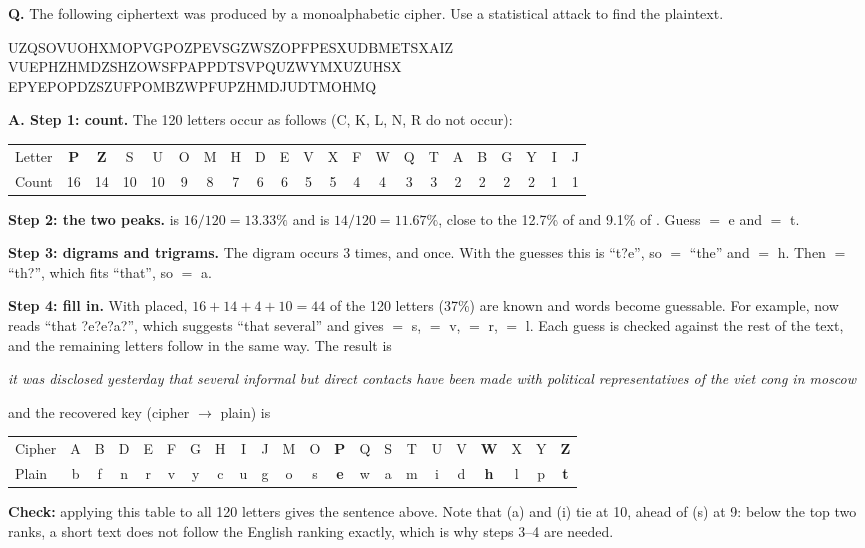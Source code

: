 \begin{worked}
\textbf{Q.} The following ciphertext was produced by a monoalphabetic cipher. Use a statistical attack to find the plaintext.
\begin{center}\small\ttfamily
UZQSOVUOHXMOPVGPOZPEVSGZWSZOPFPESXUDBMETSXAIZ\\
VUEPHZHMDZSHZOWSFPAPPDTSVPQUZWYMXUZUHSX\\
EPYEPOPDZSZUFPOMBZWPFUPZHMDJUDTMOHMQ
\end{center}
\textbf{A. Step 1: count.} The 120 letters occur as follows (C, K, L, N, R do not occur):
\begin{center}\small\setlength{\tabcolsep}{3pt}
\begin{tabular}{@{}l*{21}{c}@{}}
\toprule
Letter & \textbf{P}&\textbf{Z}&S&U&O&M&H&D&E&V&X&F&W&Q&T&A&B&G&Y&I&J\\
Count & 16&14&10&10&9&8&7&6&6&5&5&4&4&3&3&2&2&2&2&1&1\\
\bottomrule
\end{tabular}
\end{center}
\textbf{Step 2: the two peaks.}  is $16/120 = 13.33\%$ and  is $14/120 = 11.67\%$, close to the 12.7\% of  and 9.1\% of . Guess  $=$ e and  $=$ t.

\textbf{Step 3: digrams and trigrams.} The digram  occurs 3 times, and  once. With the guesses this is ``t?e'', so  $=$ ``the'' and  $=$ h. Then  $=$ ``th?'', which fits ``that'', so  $=$ a.

\textbf{Step 4: fill in.} With  placed, $16 + 14 + 4 + 10 = 44$ of the 120 letters (37\%) are known and words become guessable. For example,  now reads ``that ?e?e?a?'', which suggests ``that several'' and gives  $=$ s,  $=$ v,  $=$ r,  $=$ l. Each guess is checked against the rest of the text, and the remaining letters follow in the same way. The result is
\begin{center}\small
\emph{it was disclosed yesterday that several informal but direct contacts have been made with political representatives of the viet cong in moscow}
\end{center}
and the recovered key (cipher $\to$ plain) is
\begin{center}\small\setlength{\tabcolsep}{2.6pt}
\begin{tabular}{@{}l*{21}{c}@{}}
\toprule
Cipher & A&B&D&E&F&G&H&I&J&M&O&\textbf{P}&Q&S&T&U&V&\textbf{W}&X&Y&\textbf{Z}\\
Plain  & b&f&n&r&v&y&c&u&g&o&s&\textbf{e}&w&a&m&i&d&\textbf{h}&l&p&\textbf{t}\\
\bottomrule
\end{tabular}
\end{center}
\textbf{Check:} applying this table to all 120 letters gives the sentence above. Note that  (a) and  (i) tie at 10, ahead of  (s) at 9: below the top two ranks, a short text does not follow the English ranking exactly, which is why steps 3--4 are needed.
\end{worked}

